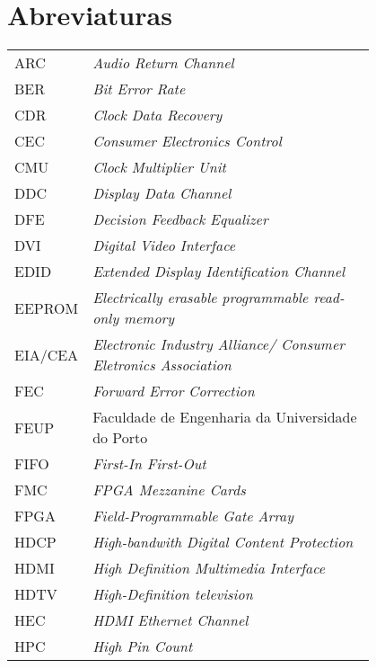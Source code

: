 \chapter*{Abreviaturas}

\begin{flushleft}
\begin{tabular}{l p{0.8\linewidth}}
ARC			& 	\textit{Audio Return Channel} 																			\\
BER			&	\textit{Bit Error Rate}																					\\
CDR			&	\textit{Clock Data Recovery}																			\\
CEC			& 	\textit{Consumer Electronics Control}																	\\
CMU			& 	\textit{Clock Multiplier Unit}																			\\
DDC			&	\textit{Display Data Channel}																			\\
DFE			&	\textit{Decision Feedback Equalizer}																	\\
DVI			&	\textit{Digital Video Interface}																		\\
EDID		&	\textit{Extended Display Identification Channel}														\\
EEPROM		&	\textit{Electrically erasable programmable read-only memory}											\\
EIA/CEA 	&	\textit{Electronic Industry Alliance/ Consumer Eletronics Association}									\\
FEC			&	\textit{Forward Error Correction}																		\\
FEUP      	& 	Faculdade de Engenharia da Universidade do Porto 														\\
FIFO		&	\textit{First-In First-Out}																				\\
FMC			&	\textit{FPGA Mezzanine Cards}																			\\
FPGA		&	\textit{Field-Programmable Gate Array}																	\\
HDCP		&	\textit{High-bandwith Digital Content Protection}														\\
HDMI		&	\textit{High Definition Multimedia Interface}															\\
HDTV		&	\textit{High-Definition television}																		\\
HEC 		&	\textit{HDMI Ethernet Channel}																			\\
HPC			&	\textit{High Pin Count}																					\\

\end{tabular}
\end{flushleft}
